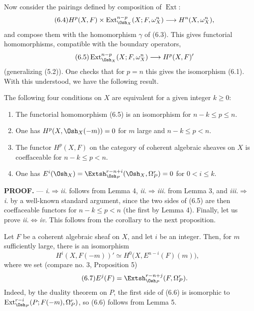 Now consider the pairings defined by composition of $\operatorname{Ext}$:
\begin{equation}\tag{6.4}
  H^{p}(X,F)\times
  \operatorname{Ext}_{\Osh_X}^{n-p}(X;F,\omega_X^{n})
  \longrightarrow H^{n}(X,\omega_X^{n}),
\end{equation}
and compose them with the homomorphism $\gamma$ of (6.3). This gives functorial
homomorphisms, compatible with the boundary operators,
\begin{equation}\tag{6.5}
  \operatorname{Ext}_{\Osh_X}^{n-p}(X;F,\omega_X^{n})
  \longrightarrow H^{p}(X,F)'
\end{equation}
(generalizing (5.2)). One checks that for $p=n$ this gives the isomorphism
(6.1). With this understood, we have the following result.

 The following four conditions on $X$ are equivalent for
a given integer $k\geq0$:
\begin{enumerate}
  \item[\textit{i.}] The functorial homomorphism (6.5) is an isomorphism for
    $n-k\leq p\leq n$.
  \item[\textit{ii.}] One has $H^{p}(X,\Osh_X(-m))=0$ for $m$ large and
    $n-k\leq p<n$.
  \item[\textit{iii.}] The functor $H^{p}(X,F)$ on the category of coherent
    algebraic sheaves on $X$ is coeffaceable for $n-k\leq p<n$.
  \item[\textit{iv.}] One has
    $E^{i}(\Osh_X)=\Extsh_{\Osh_P}^{r-n+i}(\Osh_X,\Omega_P^{r})=0$
    for $0<i\leq k$.
\end{enumerate}

\noindent\textbf{PROOF.} --- \textit{i.}$\Rightarrow$\textit{ii.} follows
from Lemma 4, \textit{ii.}$\Rightarrow$\textit{iii.} from Lemma 3, and
\textit{iii.}$\Rightarrow$\textit{i.} by a well-known standard argument, since
the two sides of (6.5) are then coeffaceable functors for $n-k\leq p<n$ (the
first by Lemma 4). Finally, let us prove
\textit{ii.}$\Leftrightarrow$\textit{iv.} This follows from the corollary to the
next proposition.

 Let $F$ be a coherent algebraic sheaf on $X$, and let
$i$ be an integer. Then, for $m$ sufficiently large, there is an isomorphism
\begin{equation}\tag{6.6}
  H^{i}(X,F(-m))'
  \simeq H^{0}\bigl(X,E^{n-i}(F)(m)\bigr),
\end{equation}
where we set (compare no. 3, Proposition 5)
\begin{equation}\tag{6.7}
  E^{j}(F)=\Extsh_{\Osh_P}^{r-n+j}(F,\Omega_P^{r}).
\end{equation}
Indeed, by the duality theorem on $P$, the first side of (6.6) is isomorphic to
$\operatorname{Ext}_{\Osh_P}^{r-i}(P;F(-m),\Omega_P^{r})$, so (6.6) follows
from Lemma 5.

